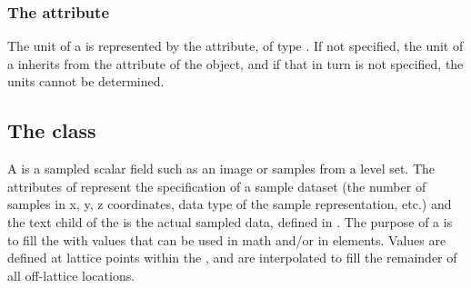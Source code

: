

\subsubsection{The \fixttspace{} attribute}
The unit of a \CoordinateComponent is represented by the  attribute, of type .  If not specified, the unit of a \CoordinateComponent inherits from the  attribute of the \Model object, and if that in turn is not specified, the \CoordinateComponent units cannot be determined.


\subsection{The  class}
\label{sampledfield-class}
A \SampledField is a sampled scalar field such as an image or samples from a level set. The attributes of \SampledField represent the specification of a sample dataset (the number of samples in x, y, z coordinates, data type of the sample representation, etc.) and the text child of the \SampledField is the actual sampled data, defined in .  The purpose of a \SampledField is to fill the \Geometry with values that can be used in math and/or in \SampledFieldGeometry elements.  Values are defined at lattice points within the \Geometry, and are interpolated to fill the remainder of all off-lattice locations.

